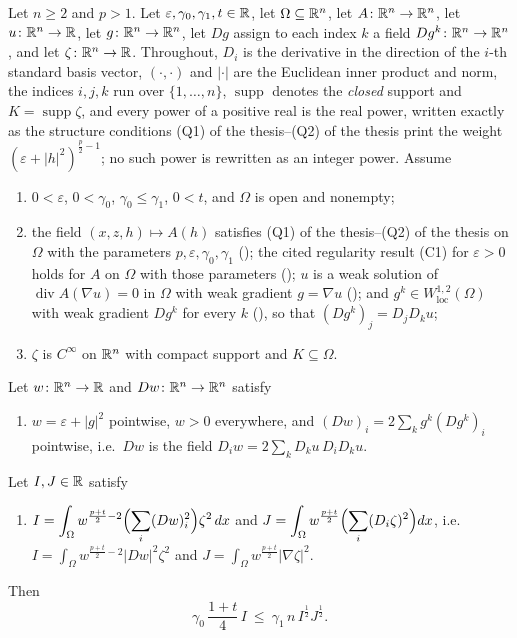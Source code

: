 \begin{helper}
Let $n\ge2$ and $p>1$.  Let $\varepsilon,\gamma_0,\gamma_1,t\in\mathbb{R}$, let
$\Omega\subseteq\mathbb{R}^n$, let $A\colon\mathbb{R}^n\to\mathbb{R}^n$, let $u\colon\mathbb{R}^n\to\mathbb{R}$, let
$g\colon\mathbb{R}^n\to\mathbb{R}^n$, let $Dg$ assign to each index $k$ a field
$Dg^k\colon\mathbb{R}^n\to\mathbb{R}^n$, and let $\zeta\colon\mathbb{R}^n\to\mathbb{R}$.  Throughout, $D_i$ is
the derivative in the direction of the $i$-th standard basis vector,
$(\cdot,\cdot)$ and $|\cdot|$ are the Euclidean inner product and norm, the
indices $i,j,k$ run over $\{1,\dots,n\}$, $\operatorname{supp}$ denotes the
\emph{closed} support and $K=\operatorname{supp}\zeta$, and every power of a
positive real is the real power, written exactly as the structure conditions
(Q1) of the thesis--(Q2) of the thesis print the weight
$(\varepsilon+|h|^2)^{\frac p2-1}$; no such power is rewritten as an integer
power.  Assume
\begin{enumerate}
\item[(H1)] $0<\varepsilon$, $0<\gamma_0$, $\gamma_0\le\gamma_1$, $0<t$, and
  $\Omega$ is open and nonempty;
\item[(H2)] the field $(x,z,h)\mapsto A(h)$ satisfies
  (Q1) of the thesis--(Q2) of the thesis on $\Omega$ with the parameters
  $p,\varepsilon,\gamma_0,\gamma_1$ (); the cited
  regularity result (C1) for $\varepsilon>0$ holds for $A$ on $\Omega$ with
  those parameters (); $u$ is a weak solution of
  $\operatorname{div}A(\nabla u)=0$ in $\Omega$ with weak gradient $g=\nabla u$
  (); and $g^k\in W^{1,2}_{\mathrm{loc}}(\Omega)$ with
  weak gradient $Dg^k$ for every $k$ (), so that
  $(Dg^k)_j=D_jD_ku$;
\item[(H3)] $\zeta$ is $C^\infty$ on $\mathbb{R}^n$ with compact support and
  $K\subseteq\Omega$.
\end{enumerate}
Let $w\colon\mathbb{R}^n\to\mathbb{R}$ and $Dw\colon\mathbb{R}^n\to\mathbb{R}^n$ satisfy
\begin{enumerate}
\item[(H4)] $w=\varepsilon+|g|^2$ pointwise, $w>0$ everywhere, and
  $(Dw)_i=2\sum_kg^k(Dg^k)_i$ pointwise, i.e.\ $Dw$ is the field
  $D_iw=2\sum_kD_ku\,D_iD_ku$.
\end{enumerate}
Let $I,J\in\mathbb{R}$ satisfy
\begin{enumerate}
\item[(H5)] $\displaystyle
  I=\int_\Omega w^{\frac{p+t}2-2}\Bigl(\sum_i(Dw)_i^2\Bigr)\zeta^2\,dx$
  and $\displaystyle
  J=\int_\Omega w^{\frac{p+t}2}\Bigl(\sum_i(D_i\zeta)^2\Bigr)dx$,
  i.e.\ $I=\int_\Omega w^{\frac{p+t}2-2}|Dw|^2\zeta^2$ and
  $J=\int_\Omega w^{\frac{p+t}2}|\nabla\zeta|^2$.
\end{enumerate}
Then
\[
\gamma_0\,\frac{1+t}4\,I\ \le\ \gamma_1\,n\,I^{\frac12}J^{\frac12}.
\]
\end{helper}
